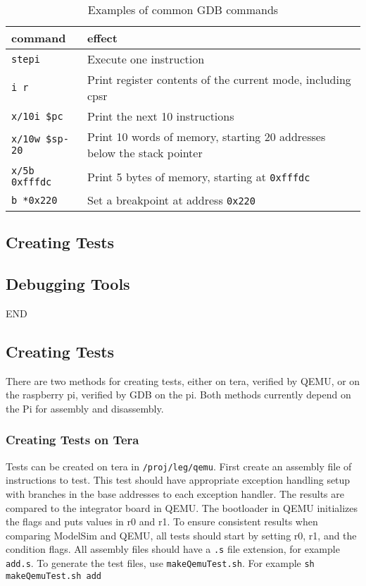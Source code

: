 \begin{table}
\centering
\begin{tabular}{|l|p{10cm}|}
\hline \textbf{command} & \textbf{effect} \\ 
\hline \texttt{stepi} & Execute one instruction \\ 
\hline \texttt{i r} & Print register contents of the current mode, including cpsr \\ 
\hline \texttt{x/10i \$pc} & Print the next 10 instructions \\ 
\hline \texttt{x/10w \$sp-20} & Print 10 words of memory, starting 20 addresses below the stack pointer \\ 
\hline \texttt{x/5b 0xfffdc} & Print 5 bytes of memory, starting at \texttt{0xfffdc} \\ 
\hline \texttt{b *0x220} & Set a breakpoint at address \texttt{0x220} \\ 
\hline 
\end{tabular} 
\caption{Examples of common GDB commands}
\label{table:gdb}
\end{table}

\subsection{Creating Tests}

\subsection{Debugging Tools}

END

\subsection{Creating Tests}
There are two methods for creating tests, either on tera, verified by QEMU, or on the raspberry pi, verified by GDB on the pi. Both methods currently depend on the Pi for assembly and disassembly. 
\subsubsection{Creating Tests on Tera}
Tests can be created on tera in \texttt{/proj/leg/qemu}. 
First create an assembly file of instructions to test. 
This test should have appropriate exception handling setup with branches in the base addresses to each exception handler. 
The results are compared to the integrator board in QEMU. 
The bootloader in QEMU initializes the flags and puts values in r0 and r1. 
To ensure consistent results when comparing ModelSim and QEMU, all tests should start by setting r0, r1, and the condition flags. 
All assembly files should have a \texttt{.s} file extension, for example \texttt{add.s}. To generate the test files, use \texttt{makeQemuTest.sh}. 
For example \texttt{sh makeQemuTest.sh add}

